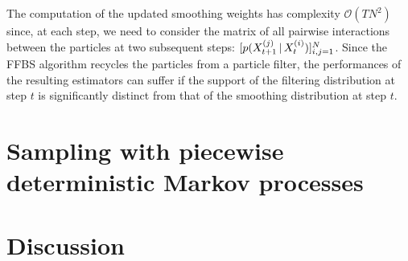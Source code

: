 The computation of the updated smoothing weights has complexity $\mathcal O(TN^{2})$ since, at each step, we need to consider the matrix of all pairwise interactions between the particles at two subsequent steps: $[p(X^{(j)}_{t+1}\,|\, X^{(i)}_{t})]_{i,j=1}^{N}$. Since the FFBS algorithm recycles the particles from a particle filter, the performances of the resulting estimators can suffer if the support of the filtering distribution at step $t$ is significantly distinct from that of the smoothing distribution at step $t$.




\section{Sampling with piecewise deterministic Markov processes}


\section{Discussion}



